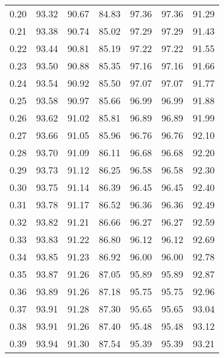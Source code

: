 \begin{tabular}{|c|c|c|c|c|c|c|}
      0.20 &     93.32 &     90.67 &      84.83 &   97.36 &      97.36 &         91.29 \\
      0.21 &     93.38 &     90.74 &      85.02 &   97.29 &      97.29 &         91.43 \\
      0.22 &     93.44 &     90.81 &      85.19 &   97.22 &      97.22 &         91.55 \\
      0.23 &     93.50 &     90.88 &      85.35 &   97.16 &      97.16 &         91.66 \\
      0.24 &     93.54 &     90.92 &      85.50 &   97.07 &      97.07 &         91.77 \\
      0.25 &     93.58 &     90.97 &      85.66 &   96.99 &      96.99 &         91.88 \\
      0.26 &     93.62 &     91.02 &      85.81 &   96.89 &      96.89 &         91.99 \\
      0.27 &     93.66 &     91.05 &      85.96 &   96.76 &      96.76 &         92.10 \\
      0.28 &     93.70 &     91.09 &      86.11 &   96.68 &      96.68 &         92.20 \\
      0.29 &     93.73 &     91.12 &      86.25 &   96.58 &      96.58 &         92.30 \\
      0.30 &     93.75 &     91.14 &      86.39 &   96.45 &      96.45 &         92.40 \\
      0.31 &     93.78 &     91.17 &      86.52 &   96.36 &      96.36 &         92.49 \\
      0.32 &     93.82 &     91.21 &      86.66 &   96.27 &      96.27 &         92.59 \\
      0.33 &     93.83 &     91.22 &      86.80 &   96.12 &      96.12 &         92.69 \\
      0.34 &     93.85 &     91.23 &      86.92 &   96.00 &      96.00 &         92.78 \\
      0.35 &     93.87 &     91.26 &      87.05 &   95.89 &      95.89 &         92.87 \\
      0.36 &     93.89 &     91.26 &      87.18 &   95.75 &      95.75 &         92.96 \\
      0.37 &     93.91 &     91.28 &      87.30 &   95.65 &      95.65 &         93.04 \\
      0.38 &     93.91 &     91.26 &      87.40 &   95.48 &      95.48 &         93.12 \\
      0.39 &     93.94 &     91.30 &      87.54 &   95.39 &      95.39 &         93.21 \\

\end{tabular}
